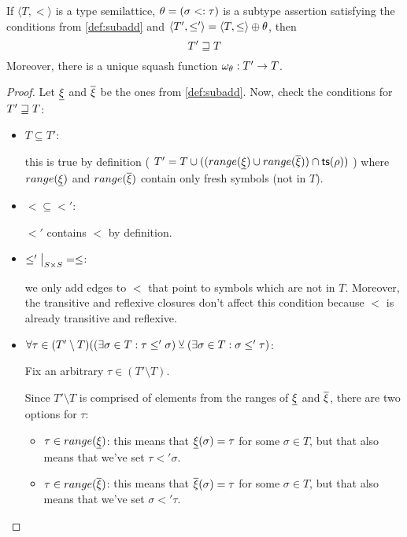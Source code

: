 \documentclass[main.tex]{subfiles}
\begin{document}
\begin{lemma}
    \label{lemma:subadd}
    If $\langle T, \less \rangle$ is a type semilattice, $\theta = (\sigma <: \tau)$
    is a subtype assertion satisfying the conditions from \cref{def:subadd}
    and $\langle T', \leq' \rangle = \langle T, \leq \rangle \oplus \theta$, then
    \[ T' \sqsupseteq T \]
    Moreover, there is a unique squash function $\omega_{\theta} : T' \rightarrow T$.
\end{lemma}
\begin{proof}
    Let $\underline{\xi}$ and $\overline{\xi}$ be the ones from \cref{def:subadd}.
    Now, check the conditions for $T' \sqsupseteq T$:
    \begin{itemize}
        \item $T \subseteq T'$:

            this is true by definition (
            $T' = T \cup ((range(\underline{\xi}) \cup range(\overline{\xi})) \cap \mathsf{ts}(\rho))$
            ) where $range(\underline{\xi})$ and $range(\overline{\xi})$ contain
            only fresh symbols (not in $T$).

        \item $\less \subseteq \less'$:

            $\less'$ contains $\less$ by definition.

        \item $\restr{\less'}{S \times S} = \less$:

            we only add edges to $\less$ that point to symbols which are not
            in $T$. Moreover, the transitive and reflexive closures don't
            affect this condition because $\less$ is already transitive and
            reflexive.

        \item $\forall \tau \in (T' \setminus T) ((\exists \sigma \in T : \tau \leq' \sigma )
            \veebar (\exists \sigma \in T : \sigma \leq' \tau)$:

            Fix an arbitrary $\tau \in (T' \setminus T)$.

            Since $T' \setminus T$ is comprised of elements from the ranges
            of $\underline{\xi}$ and $\overline{\xi}$, there are two options
            for $\tau$:
            \begin{itemize}
                \item $\tau \in range(\underline{\xi})$: this means that
                    $\underline{\xi}(\sigma) = \tau$ for some $\sigma \in T$, but that
                    also means that we've set $\tau \less' \sigma$.
                \item $\tau \in range(\overline{\xi})$: this means that
                    $\overline{\xi}(\sigma) = \tau$ for some $\sigma \in T$, but that
                    also means that we've set $\sigma \less' \tau$.
            \end{itemize}


\end{itemize}
\end{proof}
\end{document}
